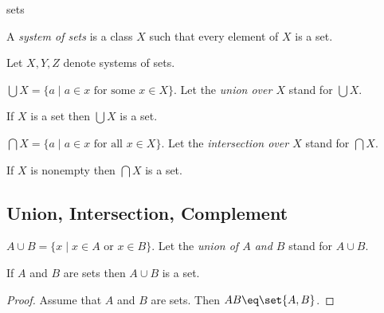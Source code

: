 \documentclass{article}
\begin{document}
\begin{smodule}{sets}
\begin{definition*}[forthel,id=SystemOfSetsDef,printid]
  A \emph{system of sets} is a class $X$ such that every element of $X$ is a set.
\end{definition*}

\begin{forthel}
  Let $X,Y,Z$ denote systems of sets.
\end{forthel}

\begin{definition*}[forthel,id=BigUnionDef,printid]
  $\bigcup X=\{a\mid a\in x\text{ for some  }x\in X\}$.
  Let the \emph{union over $X$} stand for $\bigcup X$.
\end{definition*}

\begin{axiom*}[forthel,title=Union Axiom,id=BigUnionAx,printid]
  If $X$ is a set then $\bigcup X$ is a set.
\end{axiom*}

\begin{definition*}[forthel,id=BigIntersectionDef,printid]
  $\bigcap X=\{a\mid a\in x\text{ for all }x\in X\}$.
  Let the \emph{intersection over $X$} stand for $\bigcap X$.
\end{definition*}

\begin{proposition*}[forthel,id=BigIntersectionProp,printid]
  If $X$ is nonempty then $\bigcap X$ is a set.
\end{proposition*}


\subsection{Union, Intersection, Complement}

\begin{definition*}[forthel,id=UnionDef,printid]
  $A\cup B=\{x\mid x\in A\text{ or }x\in B\}$.
  Let the \emph{union of $A$ and $B$} stand for $A\cup B$.
\end{definition*}

\begin{forthel}
  \begin{proposition*}[id=UnionProp,printid]
    If $A$ and $B$ are sets then $A\cup B$ is a set.
  \end{proposition*}
  \begin{proof}
    Assume that $A$ and $B$ are sets.
    Then $A\cup B\eq \bigcup\set{A,B}$.
  \end{proof}
\end{forthel}


\end{smodule}
\end{document}
